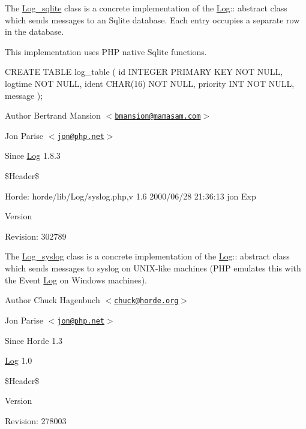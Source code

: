 The \hyperlink{class_log__sqlite}{Log\_\-sqlite} class is a concrete implementation of the \hyperlink{class_log}{Log}:: abstract class which sends messages to an Sqlite database. Each entry occupies a separate row in the database.

This implementation uses PHP native Sqlite functions.

CREATE TABLE log\_\-table ( id INTEGER PRIMARY KEY NOT NULL, logtime NOT NULL, ident CHAR(16) NOT NULL, priority INT NOT NULL, message );

\begin{DoxyAuthor}{Author}
Bertrand Mansion $<$\href{mailto:bmansion@mamasam.com}{\tt bmansion@mamasam.com}$>$ 

Jon Parise $<$\href{mailto:jon@php.net}{\tt jon@php.net}$>$ 
\end{DoxyAuthor}
\begin{DoxySince}{Since}
\hyperlink{class_log}{Log} 1.8.3
\end{DoxySince}
\$Header\$ \begin{DoxyParagraph}{Horde:}
horde/lib/Log/syslog.php,v 1.6 2000/06/28 21:36:13 jon Exp 
\end{DoxyParagraph}


\begin{DoxyVersion}{Version}

\end{DoxyVersion}
\begin{DoxyParagraph}{Revision:}
302789 
\end{DoxyParagraph}


The \hyperlink{class_log__syslog}{Log\_\-syslog} class is a concrete implementation of the \hyperlink{class_log}{Log}:: abstract class which sends messages to syslog on UNIX-\/like machines (PHP emulates this with the Event \hyperlink{class_log}{Log} on Windows machines).

\begin{DoxyAuthor}{Author}
Chuck Hagenbuch $<$\href{mailto:chuck@horde.org}{\tt chuck@horde.org}$>$ 

Jon Parise $<$\href{mailto:jon@php.net}{\tt jon@php.net}$>$ 
\end{DoxyAuthor}
\begin{DoxySince}{Since}
Horde 1.3 

\hyperlink{class_log}{Log} 1.0
\end{DoxySince}
\$Header\$

\begin{DoxyVersion}{Version}

\end{DoxyVersion}
\begin{DoxyParagraph}{Revision:}
278003 
\end{DoxyParagraph}


